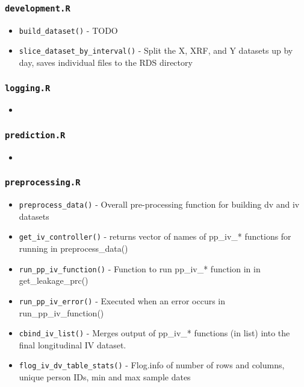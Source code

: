 \documentclass[
]{book}
\providecommand{\tightlist}{%
  \setlength{\itemsep}{0pt}\setlength{\parskip}{0pt}}
\begin{document}
\hypertarget{development.r}{%
\subsubsection{\texorpdfstring{\texttt{development.R}}{development.R}}\label{development.r}}

\begin{itemize}
\tightlist
\item
  \texttt{build\_dataset()} - TODO
\item
  \texttt{slice\_dataset\_by\_interval()} - Split the X, XRF, and Y datasets up by day, saves individual files to the RDS directory
\end{itemize}

\hypertarget{logging.r}{%
\subsubsection{\texorpdfstring{\texttt{logging.R}}{logging.R}}\label{logging.r}}

\begin{itemize}
\item
\end{itemize}

\hypertarget{prediction.r}{%
\subsubsection{\texorpdfstring{\texttt{prediction.R}}{prediction.R}}\label{prediction.r}}

\begin{itemize}
\item
\end{itemize}

\hypertarget{preprocessing.r}{%
\subsubsection{\texorpdfstring{\texttt{preprocessing.R}}{preprocessing.R}}\label{preprocessing.r}}

\begin{itemize}
\tightlist
\item
  \texttt{preprocess\_data()} - Overall pre-processing function for building dv and iv datasets
\item
  \texttt{get\_iv\_controller()} - returns vector of names of pp\_iv\_* functions for running in preprocess\_data()
\item
  \texttt{run\_pp\_iv\_function()} - Function to run pp\_iv\_* function in in get\_leakage\_prc()
\item
  \texttt{run\_pp\_iv\_error()} - Executed when an error occurs in run\_pp\_iv\_function()
\item
  \texttt{cbind\_iv\_list()} - Merges output of pp\_iv\_* functions (in list) into the final longitudinal IV dataset.
\item
  \texttt{flog\_iv\_dv\_table\_stats()} - Flog.info of number of rows and columns, unique person IDs, min and max sample dates
\end{itemize}
\end{document}
